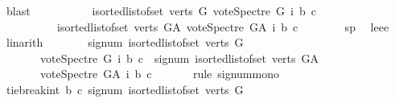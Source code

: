 \begin{isabellebody}
\ blast\isanewline
\ \ \ \ \isamarkupfalse%
\isanewline
\ \ \ \ \isamarkupfalse%
\ {\isachardoublequoteopen}{\isacharparenleft}{\kern0pt}{\isasymSum}i{\isasymleftarrow}sorted{\isacharunderscore}{\kern0pt}list{\isacharunderscore}{\kern0pt}of{\isacharunderscore}{\kern0pt}set\ {\isacharparenleft}{\kern0pt}verts\ G{\isacharparenright}{\kern0pt}{\isachardot}{\kern0pt}\ vote{\isacharunderscore}{\kern0pt}Spectre\ G\ i\ b\ c{\isacharparenright}{\kern0pt}\ {\isasymle}\isanewline
\ \ \ \ \ \ \ \ \ \ {\isacharparenleft}{\kern0pt}{\isasymSum}i{\isasymleftarrow}sorted{\isacharunderscore}{\kern0pt}list{\isacharunderscore}{\kern0pt}of{\isacharunderscore}{\kern0pt}set\ {\isacharparenleft}{\kern0pt}verts\ G{\isacharunderscore}{\kern0pt}A{\isacharparenright}{\kern0pt}{\isachardot}{\kern0pt}\ vote{\isacharunderscore}{\kern0pt}Spectre\ G{\isacharunderscore}{\kern0pt}A\ i\ b\ c{\isacharparenright}{\kern0pt}{\isachardoublequoteclose}\isanewline
\ \ \ \ \ \ \isamarkupfalse%
\ sp{}\ \isamarkupfalse%
\ leee\ \isamarkupfalse%
\ linarith\isanewline
\ \ \ \ \isamarkupfalse%
\ \isamarkupfalse%
\ {\isachardoublequoteopen}signum\ {\isacharparenleft}{\kern0pt}{\isasymSum}i{\isasymleftarrow}sorted{\isacharunderscore}{\kern0pt}list{\isacharunderscore}{\kern0pt}of{\isacharunderscore}{\kern0pt}set\ {\isacharparenleft}{\kern0pt}verts\ G{\isacharparenright}{\kern0pt}{\isachardot}{\kern0pt}\isanewline
\ \ \ \ \ \ \ vote{\isacharunderscore}{\kern0pt}Spectre\ G\ i\ b\ c{\isacharparenright}{\kern0pt}\ {\isasymle}\ signum\ {\isacharparenleft}{\kern0pt}{\isasymSum}i{\isasymleftarrow}sorted{\isacharunderscore}{\kern0pt}list{\isacharunderscore}{\kern0pt}of{\isacharunderscore}{\kern0pt}set\ {\isacharparenleft}{\kern0pt}verts\ G{\isacharunderscore}{\kern0pt}A{\isacharparenright}{\kern0pt}{\isachardot}{\kern0pt}\isanewline
\ \ \ \ \ \ \ vote{\isacharunderscore}{\kern0pt}Spectre\ G{\isacharunderscore}{\kern0pt}A\ i\ b\ c{\isacharparenright}{\kern0pt}{\isachardoublequoteclose}\isanewline
\ \ \ \ \ \ \isamarkupfalse%
{\isacharparenleft}{\kern0pt}rule\ signum{\isacharunderscore}{\kern0pt}mono{\isacharparenright}{\kern0pt}\isanewline
\ \ \ \ \isamarkupfalse%
\ \isamarkupfalse%
\ {\isachardoublequoteopen}tie{\isacharunderscore}{\kern0pt}break{\isacharunderscore}{\kern0pt}int\ b\ c\ {\isacharparenleft}{\kern0pt}signum\ {\isacharparenleft}{\kern0pt}{\isasymSum}i{\isasymleftarrow}sorted{\isacharunderscore}{\kern0pt}list{\isacharunderscore}{\kern0pt}of{\isacharunderscore}{\kern0pt}set\ {\isacharparenleft}{\kern0pt}verts\ G{\isacharparenright}{\kern0pt}{\isachardot}{\kern0pt}\isanewline

\end{isabellebody}
